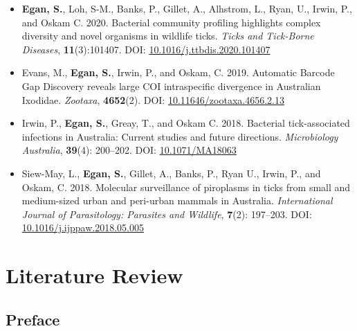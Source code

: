 \documentclass[a4paper, nobind]{templates/ociamthesis}
\renewcommand{\chaptermark}[1]{\markboth{\thechapter. #1}{\thechapter. #1}}
\begin{document}
\begin{itemize}
\item
  \textbf{Egan, S.}, Loh, S-M., Banks, P., Gillet, A., Alhstrom, L., Ryan, U., Irwin, P., and Oskam C. 2020. Bacterial community profiling highlights complex diversity and novel organisms in wildlife ticks. \emph{Ticks and Tick-Borne Diseases}, \textbf{11}(3):101407. DOI: \href{https://doi.org/10.1016/j.ttbdis.2020.101407}{10.1016/j.ttbdis.2020.101407}
\item
  Evans, M., \textbf{Egan, S.}, Irwin, P., and Oskam, C. 2019. Automatic Barcode Gap Discovery reveals large COI intraspecific divergence in Australian Ixodidae. \emph{Zootaxa}, \textbf{4652}(2). DOI: \href{https://doi.org/10.11646/zootaxa.4656.2.13}{10.11646/zootaxa.4656.2.13}
\item
  Irwin, P., \textbf{Egan, S.}, Greay, T., and Oskam C. 2018. Bacterial tick-associated infections in Australia: Current studies and future directions. \emph{Microbiology Australia}, \textbf{39}(4): 200--202. DOI: \href{https://doi.org/10.1071/MA18063}{10.1071/MA18063}
\item
  Siew-May, L., \textbf{Egan, S.}, Gillet, A., Banks, P., Ryan U., Irwin, P., and Oskam, C. 2018. Molecular surveillance of piroplasms in ticks from small and medium-sized urban and peri-urban mammals in Australia. \emph{International Journal of Parasitology: Parasites and Wildlife}, \textbf{7}(2): 197--203. DOI: \href{https://doi.org/10.1016/j.ijppaw.2018.05.005}{10.1016/j.ijppaw.2018.05.005}
\end{itemize}

\hypertarget{litrev}{%
\chapter{Literature Review}\label{litrev}}

\chaptermark{Review}

\minitoc 

\hypertarget{preface}{%
\section*{Preface}\label{preface}}

\nocite{guglielmoneIxodidaeAcariIxodoidea2020}
\nocite{lohIdentificationTheileriaFuliginosalike2018}
\nocite{cooperDetectionCoxiellaBurnetii2013} \nocite{greayIlluminatingBacterialMicrobiome2021} \nocite{brodyCaseTickTyphus1946} \nocite{popeIsolationRickettsiaResembling1955} \nocite{owenDetectionIdentificationNovel2006} \nocite{owenPotentiallyPathogenicSpotted2006} \nocite{sentausaGenomeSequenceRickettsia2013} \nocite{liHighPrevalenceRickettsia2010} \nocite{abdadRickettsiaGravesiiSp2017} \nocite{owenDetectionCharacterisationRickettsiae2007} \nocite{bennettCoxiellaBurnetiiWestern2011}
\nocite{jefferiesTwoSpeciesCanine2003}
\end{document}
